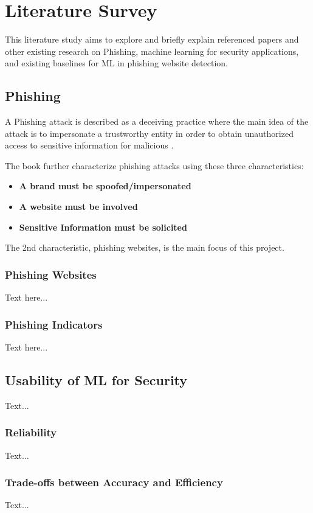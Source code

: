 \documentclass{sigkddExp}
\begin{document}
\section{Literature Survey}
This literature study aims to explore and briefly explain referenced papers and other existing research on Phishing, machine learning for security applications, and existing baselines for ML in phishing website detection.
\subsection{Phishing}
A Phishing attack is described as a deceiving practice where the main idea of the attack is to impersonate a trustworthy entity in order to obtain unauthorized access to sensitive information for malicious \cite{10.5555/1071752.1071800, Ramzan2010}.

\vspace{1em}

The book \cite{Ramzan2010} further characterize phishing attacks using these three characteristics:

\begin{itemize}
	\item \textbf{A brand must be spoofed/impersonated}
	\item \textbf{A website must be involved}
	\item \textbf{Sensitive Information must be solicited}
\end{itemize}

The 2nd characteristic, phishing websites, is the main focus of this project.
\subsubsection{Phishing Websites}
Text here...
\subsubsection{Phishing Indicators}
Text here...
\subsection{Usability of ML for Security}
Text...
\subsubsection{Reliability}
Text...
\subsubsection{Trade-offs between Accuracy and Efficiency}
Text...
\end{document}
